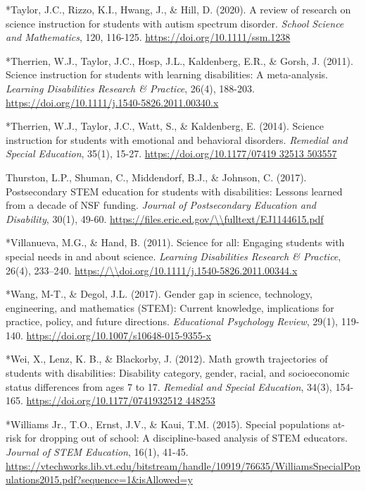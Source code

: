 \documentclass[11pt]{sig-alternate}
\begin{document}
\begin{large}
*Taylor, J.C., Rizzo, K.I., Hwang, J., \& Hill, D. (2020). A review of research on science instruction for students with autism spectrum disorder.\textit{ School Science and Mathematics}, 120, 116-125. \url{https://doi.org/10.1111/ssm.1238}

*Therrien, W.J., Taylor, J.C., Hosp, J.L., Kaldenberg, E.R., \& Gorsh, J. (2011). Science instruction for students with learning disabilities: A meta-analysis. \textit{Learning Disabilities Research \& Practice}, 26(4), 188-203. \url{https://doi.org/10.1111/j.1540-5826.2011.00340.x}

*Therrien, W.J., Taylor, J.C., Watt, S., \& Kaldenberg, E. (2014). Science instruction for students with emotional and behavioral disorders.\textit{ Remedial and Special Education}, 35(1), 15-27. \url{https://doi.org/10.1177/07419 32513 503557}

Thurston, L.P., Shuman, C., Middendorf, B.J., \& Johnson, C. (2017). Postsecondary STEM education for students with disabilities: Lessons learned from a decade of NSF funding. \textit{Journal of Postsecondary Education and Disability}, 30(1), 49-60. \url{https://files.eric.ed.gov/\\fulltext/EJ1144615.pdf}

*Villanueva, M.G., \& Hand, B. (2011). Science for all: Engaging students with special needs in and about science. \textit{Learning Disabilities Research \& Practice}, 26(4), 233–240. \url{https://\\doi.org/10.1111/j.1540-5826.2011.00344.x}

*Wang, M-T., \& Degol, J.L. (2017). Gender gap in science, technology, engineering, and mathematics (STEM): Current knowledge, implications for practice, policy, and future directions. \textit{Educational Psychology Review}, 29(1), 119-140. \url{https://doi.org/10.1007/s10648-015-9355-x}

*Wei, X., Lenz, K. B., \& Blackorby, J. (2012). Math growth trajectories of students with disabilities: Disability category, gender, racial, and socioeconomic status differences from ages 7 to 17. \textit{Remedial and Special Education}, 34(3), 154-165. \url{https://doi.org/10.1177/0741932512 448253}

*Williams Jr., T.O., Ernst, J.V., \& Kaui, T.M. (2015). Special populations at-risk for dropping out of school: A discipline-based analysis of STEM educators. \textit{Journal of STEM Education}, 16(1), 41-45. \url{https://vtechworks.lib.vt.edu/bitstream/handle/10919/76635/WilliamsSpecialPopulations2015.pdf?sequence=1\&isAllowed=y}


\end{large}
\end{document}
